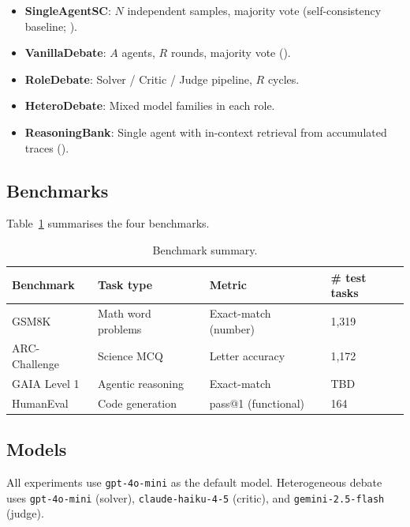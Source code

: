 \documentclass[11pt]{article}
\begin{document}
\begin{itemize}
    \item \textbf{SingleAgentSC}: $N$ independent samples, majority vote
          (self-consistency baseline; \citealt{wang2023selfconsistency}).
    \item \textbf{VanillaDebate}: $A$ agents, $R$ rounds, majority vote
          (\citealt{du2024improving}).
    \item \textbf{RoleDebate}: Solver / Critic / Judge pipeline, $R$ cycles.
    \item \textbf{HeteroDebate}: Mixed model families in each role.
    \item \textbf{ReasoningBank}: Single agent with in-context retrieval
          from accumulated traces (\citealt{ouyang2025reasoningbank}).
\end{itemize}

\subsection{Benchmarks}

Table~\ref{tab:benchmarks} summarises the four benchmarks.

\begin{table}[h]
\centering
\caption{Benchmark summary.}
\label{tab:benchmarks}
\begin{tabular}{llll}
\toprule
\textbf{Benchmark} & \textbf{Task type} & \textbf{Metric} & \textbf{\# test tasks} \\
\midrule
GSM8K              & Math word problems & Exact-match (number) & 1,319 \\
ARC-Challenge      & Science MCQ        & Letter accuracy       & 1,172 \\
GAIA Level 1       & Agentic reasoning  & Exact-match           & TBD \\
HumanEval          & Code generation    & pass@1 (functional)   & 164 \\
\bottomrule
\end{tabular}
\end{table}

\subsection{Models}

All experiments use \texttt{gpt-4o-mini} as the default model.
Heterogeneous debate uses \texttt{gpt-4o-mini} (solver),
\texttt{claude-haiku-4-5} (critic), and \texttt{gemini-2.5-flash} (judge).
\end{document}
